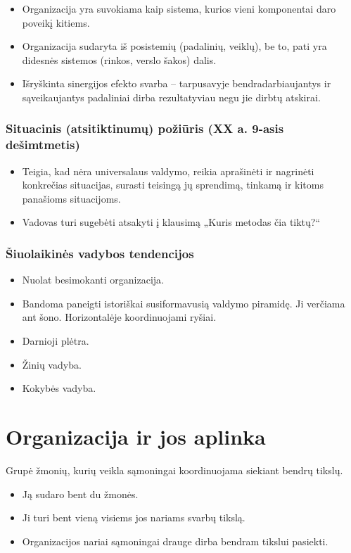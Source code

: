 \begin{itemize}
  \item Organizacija yra suvokiama kaip sistema, kurios vieni komponentai
    daro poveikį kitiems.
  \item Organizacija sudaryta iš posistemių (padalinių, veiklų), be to,
    pati yra didesnės sistemos (rinkos, verslo šakos) dalis.
  \item Išryškinta sinergijos efekto svarba – tarpusavyje 
    bendradarbiaujantys ir sąveikaujantys padaliniai dirba rezultatyviau
    negu jie dirbtų atskirai.
\end{itemize}

\subsection{Situacinis (atsitiktinumų) požiūris (XX a. 9-asis dešimtmetis)}

\begin{itemize}
  \item Teigia, kad nėra universalaus valdymo, reikia aprašinėti ir
    nagrinėti konkrečias situacijas, surasti teisingą jų sprendimą,
    tinkamą ir kitoms panašioms situacijoms.
  \item Vadovas turi sugebėti atsakyti į klausimą „Kuris metodas čia
    tiktų?“
\end{itemize}

\subsection{Šiuolaikinės vadybos tendencijos}

\begin{itemize}
  \item Nuolat besimokanti organizacija.
  \item Bandoma paneigti istoriškai susiformavusią valdymo piramidę.
    Ji verčiama ant šono. Horizontalėje koordinuojami ryšiai.
  \item Darnioji plėtra.
  \item Žinių vadyba.
  \item Kokybės vadyba.
\end{itemize}

\chapter{Organizacija ir jos aplinka}

\begin{defn}[Organizacija]
  Grupė žmonių, kurių veikla sąmoningai koordinuojama siekiant bendrų
  tikslų.

  \begin{itemize}
    \item Ją sudaro bent du žmonės.
    \item Ji turi bent vieną visiems jos nariams svarbų tikslą.
    \item Organizacijos nariai sąmoningai drauge dirba bendram tikslui
      pasiekti.
  \end{itemize}
\end{defn}

